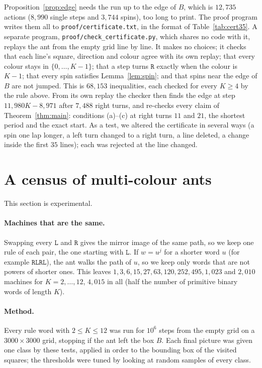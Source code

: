 \documentclass[11pt,a4paper]{article}
\theoremstyle{definition}
\theoremstyle{remark}
\newcommand{\Lw}{\mathtt{L}}
\newcommand{\Rw}{\mathtt{R}}
\begin{document}
Proposition~\ref{prop:edge} needs the run up to the edge of $B$, which is $12{,}735$ actions ($8{,}990$ single
steps and $3{,}744$ spins), too long to print. The proof program writes them all to
\texttt{proof/certificate.txt}, in the format of Table~\ref{tab:cert35}. A separate program,
\texttt{proof/check\_certificate.py}, which shares no code with it, replays the ant from the empty grid line by
line. It makes no choices; it checks that each line's square, direction and colour agree with its own replay;
that every colour stays in $\{0, \dots, K-1\}$; that a step turns $\Rw$ exactly when the colour is $K - 1$; that
every spin satisfies Lemma~\ref{lem:spin}; and that spins near the edge of $B$ are not jumped. This is
$68{,}153$ inequalities, each checked for every $K \ge 4$ by the rule above. From its own replay the checker
then finds the edge at step $11{,}980K - 8{,}971$ after $7{,}488$ right turns, and re-checks every claim of
Theorem~\ref{thm:main}: conditions (a)--(c) at right turns $11$ and $21$, the shortest period and the exact
start. As a test, we altered the certificate in several ways (a spin one lap longer, a left turn changed to a
right turn, a line deleted, a change inside the first $35$ lines); each was rejected at the line changed.

\section{A census of multi-colour ants}\label{sec:census}

This section is experimental.

\paragraph{Machines that are the same.} Swapping every $\Lw$ and $\Rw$ gives the mirror image of the same path,
so we keep one rule of each pair, the one starting with $\Lw$. If $w = u^j$ for a shorter word $u$ (for example
$\Rw\Lw\Rw\Lw$), the ant walks the path of $u$, so we keep only words that are not powers of shorter ones.
This leaves $1, 3, 6, 15, 27, 63, 120, 252, 495, 1{,}023$ and $2{,}010$ machines for $K = 2, \dots, 12$,
$4{,}015$ in all (half the number of primitive binary words of length $K$).

\paragraph{Method.} Every rule word with $2 \le K \le 12$ was run for $10^6$ steps from the empty grid on a
$3000 \times 3000$ grid, stopping if the ant left the box $B$. Each final picture was given one class by these
tests, applied in order to the bounding box of the visited squares; the thresholds were tuned by looking at
random samples of every class.
\end{document}
